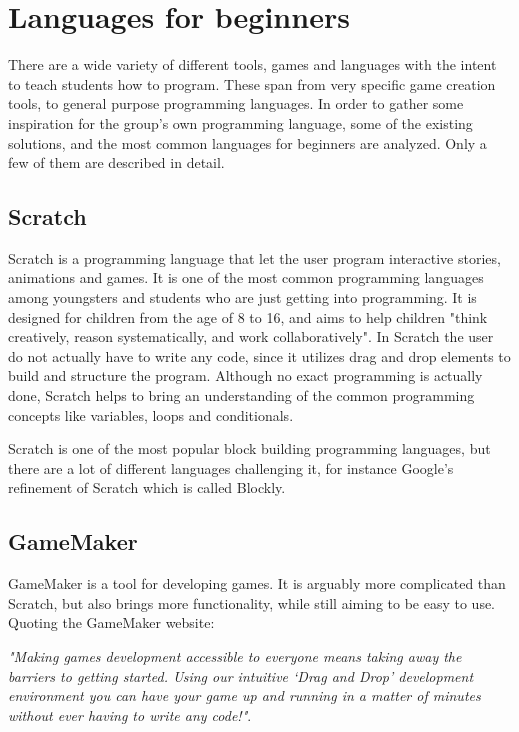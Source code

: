 \section{Languages for beginners}

There are a wide variety of different tools, games and languages with the intent to teach students how to program. 
These span from very specific game creation tools, to general purpose programming languages. 
In order to gather some inspiration for the group's own programming language, some of the existing solutions, and the most common languages for beginners are analyzed.
Only a few of them are described in detail.

\subsection{Scratch}
\label{sec:Scratch}
Scratch is a programming language that let the user program interactive stories, animations and games. 
It is one of the most common programming languages among youngsters and students who are just getting into programming. 
It is designed for children from the age of 8 to 16, and aims to help children "think creatively, reason systematically, and work collaboratively". 
In Scratch the user do not actually have to write any code, since it utilizes drag and drop elements to build and structure the program. 
Although no exact programming is actually done, Scratch helps to bring an understanding of the common programming concepts like variables, loops and conditionals\cite{ScratchWebsite}.

Scratch is one of the most popular block building programming languages, but there are a lot of different languages challenging it, for instance Google's refinement of Scratch which is called Blockly\cite{Blockly}.

\subsection{GameMaker}
GameMaker is a tool for developing games. 
It is arguably more complicated than Scratch, but also brings more functionality, while still aiming to be easy to use. 
Quoting the GameMaker website: 

\textit{"Making games development accessible to everyone means taking away the barriers to getting started. 
Using our intuitive ‘Drag and Drop’ development environment you can have your game up and running in a matter of minutes without ever having to write any code!"}\cite{GameMaker}.
 

